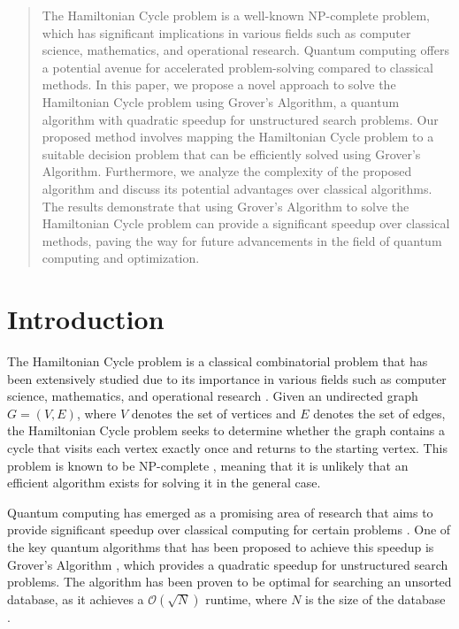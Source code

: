 \begin{abstract}
The Hamiltonian Cycle problem is a well-known NP-complete problem, which has significant implications in various fields such as computer science, mathematics, and operational research. Quantum computing offers a potential avenue for accelerated problem-solving compared to classical methods. In this paper, we propose a novel approach to solve the Hamiltonian Cycle problem using Grover's Algorithm, a quantum algorithm with quadratic speedup for unstructured search problems. Our proposed method involves mapping the Hamiltonian Cycle problem to a suitable decision problem that can be efficiently solved using Grover's Algorithm. Furthermore, we analyze the complexity of the proposed algorithm and discuss its potential advantages over classical algorithms. The results demonstrate that using Grover's Algorithm to solve the Hamiltonian Cycle problem can provide a significant speedup over classical methods, paving the way for future advancements in the field of quantum computing and optimization.
\end{abstract}

\section{Introduction}\label{sec:introduction}

The Hamiltonian Cycle problem is a classical combinatorial problem that has been extensively studied due to its importance in various fields such as computer science, mathematics, and operational research \cite{papadimitriou1998combinatorial}. Given an undirected graph $G = (V, E)$, where $V$ denotes the set of vertices and $E$ denotes the set of edges, the Hamiltonian Cycle problem seeks to determine whether the graph contains a cycle that visits each vertex exactly once and returns to the starting vertex. This problem is known to be NP-complete \cite{karp1972reducibility}, meaning that it is unlikely that an efficient algorithm exists for solving it in the general case.

Quantum computing has emerged as a promising area of research that aims to provide significant speedup over classical computing for certain problems \cite{nielsen2010quantum}. One of the key quantum algorithms that has been proposed to achieve this speedup is Grover's Algorithm \cite{grover1996fast}, which provides a quadratic speedup for unstructured search problems. The algorithm has been proven to be optimal for searching an unsorted database, as it achieves a $\mathcal{O}(\sqrt{N})$ runtime, where $N$ is the size of the database \cite{bennett1997strengths}.

